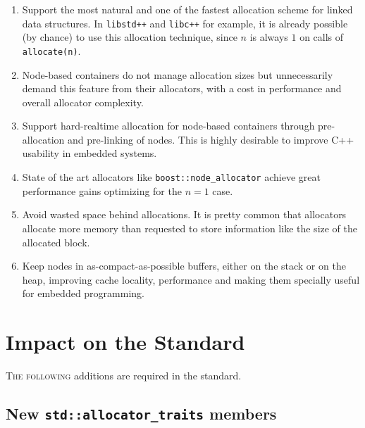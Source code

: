 \documentclass[11pt]{article}
\begin{document}
\begin{enumerate}

\item Support the most natural and one of the fastest allocation
scheme for linked data structures. In \texttt{libstd++} and
\texttt{libc++} for example, it is already possible (by chance) to use
this allocation technique, since $n$ is always $1$ on calls of
\texttt{allocate(n)}.

\item Node-based containers do not manage allocation sizes but
unnecessarily demand this feature from their allocators, with a cost
in performance and overall allocator complexity.


\item Support hard-realtime allocation for node-based containers
through pre-allocation and pre-linking of nodes. This is highly
desirable to improve C++ usability in embedded systems.

\item State of the art allocators like \texttt{boost::node\_allocator}
\cite{boost} achieve great performance gains optimizing for the $n = 1$ case. 

\item Avoid wasted space behind allocations. It is pretty common that
allocators allocate more memory than requested to store information
like the size of the allocated block.

\item Keep nodes in as-compact-as-possible buffers, either on the
stack or on the heap, improving cache locality, performance and making
them specially useful for embedded programming.

\end{enumerate}

\section{Impact on the Standard} \label{impact}

\textsc{The following} additions are required in the standard.

\subsection{New \texttt{std::allocator\_traits} members}
\end{document}
